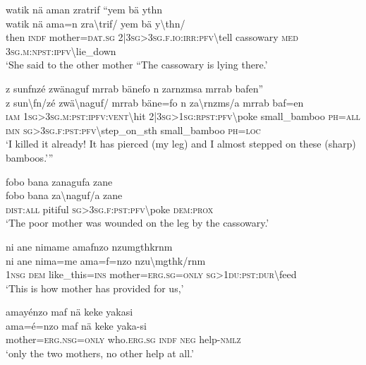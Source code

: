 \newpage
\ea\label{ex:14:a3051}
watik nä aman zratrif ``yem bä ythn\\
\gll watik	nä	ama=n	zra{\textbackslash}trif/	yem	bä	y{\textbackslash}thn/\\
     then	\textsc{indf}	mother=\textsc{dat}.\textsc{sg}	2|3\textsc{sg}>3\textsc{sg}.\textsc{f}.\textsc{io}:\textsc{irr}:\textsc{pfv}{\textbackslash}tell	cassowary	\textsc{med}	3\textsc{sg}.\textsc{m}:\textsc{npst}:\textsc{ipfv}{\textbackslash}lie\_down\\
\glt `She said to the other mother ``The cassowary is lying there.'
\z

\ea\label{ex:14:a3052}
z sunfnzé zwänaguf mrrab bänefo n zarnzmsa mrrab bafen''\\
\gll z	sun{\textbackslash}fn/zé	zwä{\textbackslash}naguf/	mrrab	bäne=fo	n	za{\textbackslash}rnzms/a	mrrab	baf=en\\
     \textsc{iam}	1\textsc{sg}>3\textsc{sg}.\textsc{m}:\textsc{pst}:\textsc{ipfv}:\textsc{vent}{\textbackslash}hit	2|3\textsc{sg}>1\textsc{sg}:\textsc{rpst}:\textsc{pfv}{\textbackslash}poke	small\_bamboo	\textsc{ph}=\textsc{all}	\textsc{imn}	\textsc{sg}>3\textsc{sg}.\textsc{f}:\textsc{pst}:\textsc{pfv}{\textbackslash}step\_on\_sth	small\_bamboo	\textsc{ph}=\textsc{loc}\\
\glt `I killed it already! It has pierced (my leg) and I almost stepped on these (sharp) bamboos.'''
\z

\ea\label{ex:14:a3054}
fobo bana zanagufa zane\\
\gll fobo	bana	za{\textbackslash}naguf/a	zane\\
     \textsc{dist}:\textsc{all}	pitiful	\textsc{sg}>3\textsc{sg}.\textsc{f}:\textsc{pst}:\textsc{pfv}{\textbackslash}poke	\textsc{dem}:\textsc{prox}\\
\glt `The poor mother was wounded on the leg by the cassowary.'
\z

\ea\label{ex:14:a3055}
ni ane nimame amafnzo nzumgthkrnm\\
\gll ni	ane	nima=me	ama=f=nzo	nzu{\textbackslash}mgthk/rnm\\
     1\textsc{nsg}	\textsc{dem}	like\_this=\textsc{ins}	mother=\textsc{erg}.\textsc{sg}=\textsc{only}	\textsc{sg}>1\textsc{du}:\textsc{pst}:\textsc{dur}{\textbackslash}feed\\
\glt `This is how mother has provided for us,'
\z

\ea\label{ex:14:a3056}
amayénzo maf nä keke yakasi\\
\gll ama=é=nzo	maf	nä	keke	yaka-si\\
     mother=\textsc{erg}.\textsc{nsg}=\textsc{only}	who.\textsc{erg}.\textsc{sg}	\textsc{indf}	\textsc{neg}	help-\textsc{nmlz}\\
\glt `only the two mothers, no other help at all.'
\z

